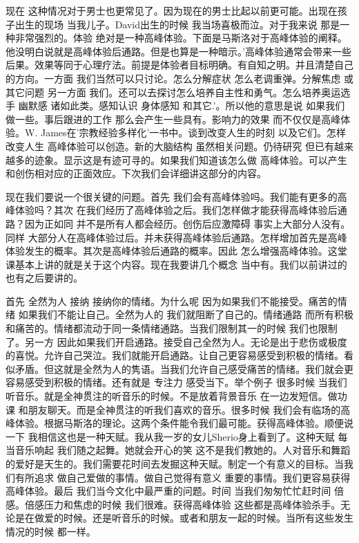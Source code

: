 现在 这种情况对于男士也更常见了。因为现在的男士比起以前更可能。出现在孩子出生的现场 当我儿子。David出生的时候 我当场喜极而泣。对于我来说 那是一种非常强烈的。体验 绝对是一种高峰体验。下面是马斯洛对于高峰体验的阐释。他没明白说就是高峰体验后通路。但是也算是一种暗示。'高峰体验通常会带来一些后果。效果等同于心理疗法。前提是体验者目标明确。有自知之明。并且清楚自己的方向。一方面 我们当然可以只讨论。怎么分解症状 怎么老调重弹。分解焦虑 或其它问题 另一方面 我们。还可以去探讨怎么培养自主性和勇气。怎么培养奥运选手 幽默感 诸如此类。感知认识 身体感知 和其它.'。所以他的意思是说 如果我们做一些。事后跟进的工作 那么会产生一些具有。影响力的效果 而不仅仅是高峰体验。W. James在'宗教经验多样化'一书中。谈到改变人生的时刻 以及它们。怎样改变人生 高峰体验可以创造。新的大脑结构 虽然相关问题。仍待研究 但已有越来越多的迹象。显示这是有迹可寻的。如果我们知道该怎么做 高峰体验。可以产生和创伤相对应的正面效应。下次我们会详细讲这部分的内容。 

现在我们要说一个很关键的问题。首先 我们会有高峰体验吗。我们能有更多的高峰体验吗？其次 在我们经历了高峰体验之后。我们怎样做才能获得高峰体验后通路？因为正如同 并不是所有人都会经历。创伤后应激障碍 事实上大部分人没有。同样 大部分人在高峰体验过后。并未获得高峰体验后通路。怎样增加首先是高峰体验发生的概率。其次是高峰体验后通路的概率。因此 怎么增强高峰体验。这堂课基本上讲的就是关于这个内容。现在我要讲几个概念 当中有。我们以前讲过的 也有之后要讲的。 

首先 全然为人 接纳 接纳你的情绪。为什么呢 因为如果我们不能接受。痛苦的情绪 如果我们不能让自己。全然为人的 我们就阻断了自己的。情绪通路 而所有积极和痛苦的。情绪都流动于同一条情绪通路。当我们限制其一的时候 我们也限制了。另一方 因此如果我们开启通路。接受自己全然为人。无论是出于悲伤或极度的喜悦。允许自己哭泣。我们就能开启通路。让自己更容易感受到积极的情绪。看似矛盾。但这就是全然为人的隽语。当我们允许自己感受痛苦的情绪。我们就会更容易感受到积极的情绪。还有就是 专注力 感受当下。举个例子 很多时候 当我们听音乐。就是全神贯注的听音乐的时候。不是放着背景音乐 在一边发短信。做功课 和朋友聊天。而是全神贯注的听我们喜欢的音乐。很多时候 我们会有临场的高峰体验。根据马斯洛的理论。这两个条件能令我们最可能。获得高峰体验。顺便说一下 我相信这也是一种天赋。我从我一岁的女儿Sherio身上看到了。这种天赋 每当音乐响起 我们随之起舞。她就会开心的笑 这不是我们教她的。人对音乐和舞蹈的爱好是天生的。我们需要花时间去发掘这种天赋。制定一个有意义的目标。当我们有所追求 做自己爱做的事情。做自己觉得有意义 重要的事情。我们更容易获得高峰体验。最后 我们当今文化中最严重的问题。时间 当我们匆匆忙忙赶时间 倍感。倍感压力和焦虑的时候 我们很难。获得高峰体验 这些都是高峰体验杀手。无论是在做爱的时候。还是听音乐的时候。或者和朋友一起的时候。当所有这些发生情况的时候 都一样。 

